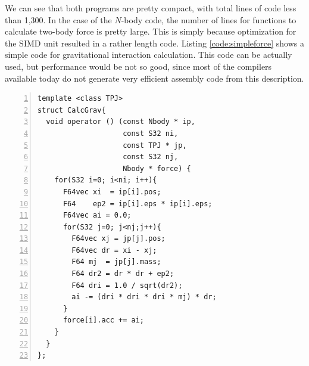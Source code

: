 \documentclass[dvipdfmx]{acm_proc_article-sp}
\begin{document}
We can see that both programs are pretty compact, with total lines of
code less than 1,300. In the case of the $N$-body code, the number of
lines for functions to calculate two-body force is pretty large. This
is simply because optimization for the SIMD unit resulted in a rather
length code. Listing \ref{code:simpleforce} shows a simple code for
gravitational interaction calculation. This code can be actually used,
but performance would be not so good, since most of the compilers
available today do not generate very efficient assembly code from this
description.

\begin{lstlisting}[label=code:simpleforce,numbers=left,numbersep=5pt,frame=single,basicstyle=\ttfamily,caption=A sample code of $N$-body simulation]
template <class TPJ>
struct CalcGrav{
  void operator () (const Nbody * ip,
                    const S32 ni,
                    const TPJ * jp,
                    const S32 nj,
                    Nbody * force) {
    for(S32 i=0; i<ni; i++){
      F64vec xi  = ip[i].pos;
      F64    ep2 = ip[i].eps * ip[i].eps;
      F64vec ai = 0.0;
      for(S32 j=0; j<nj;j++){
        F64vec xj = jp[j].pos;
        F64vec dr = xi - xj;
        F64 mj  = jp[j].mass;
        F64 dr2 = dr * dr + ep2;
        F64 dri = 1.0 / sqrt(dr2);                
        ai -= (dri * dri * dri * mj) * dr;
      }
      force[i].acc += ai;
    }
  }
};
\end{lstlisting}
\end{document}
